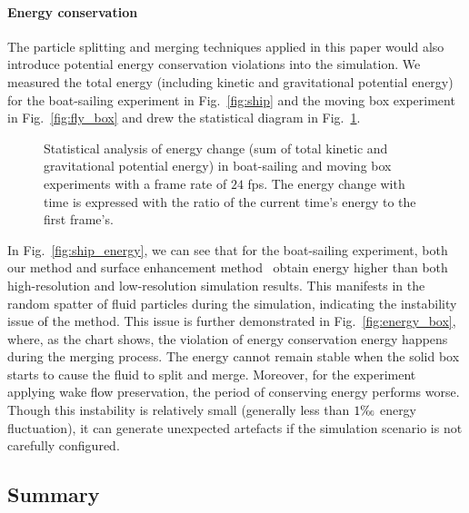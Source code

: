 \documentclass[VANCOUVER,STIX1COL]{WileyNJD-v2}
\begin{document}
\paragraph{Energy conservation}

The particle splitting and merging techniques applied in this paper would also introduce potential energy conservation violations into the simulation.  We measured the total energy (including kinetic and gravitational potential energy) for the boat-sailing experiment in Fig.~\ref{fig:ship} and the moving box experiment in Fig.~\ref{fig:fly_box} and drew the statistical diagram in Fig.~\ref{fig:energy_diagram}.

\begin{figure}[h]
    \centering
    \vspace{-0.7\baselineskip}
    \caption{Statistical analysis of energy change (sum of total kinetic and gravitational potential energy) in boat-sailing and moving box experiments with a frame rate of $24$ fps. The energy change with time is expressed with the ratio of the current time's energy to the first frame's.}
    \label{fig:energy_diagram}
\end{figure}

In Fig.~\ref{fig:ship_energy}, we can see that for the boat-sailing experiment, both our method and surface enhancement method~\cite{Winchenbach17} obtain energy higher than both high-resolution and low-resolution simulation results. This manifests in the random spatter of fluid particles during the simulation, indicating the instability issue of the method. This issue is further demonstrated in Fig.~\ref{fig:energy_box}, where, as the chart shows, the violation of energy conservation energy happens during the merging process. The energy cannot remain stable when the solid box starts to cause the fluid to split and merge. Moreover, for the experiment applying wake flow preservation, the period of conserving energy performs worse. Though this instability is relatively small (generally less than $1\text{\textperthousand}$ energy fluctuation), it can generate unexpected artefacts if the simulation scenario is not carefully configured.

\subsection{Summary}
\end{document}
